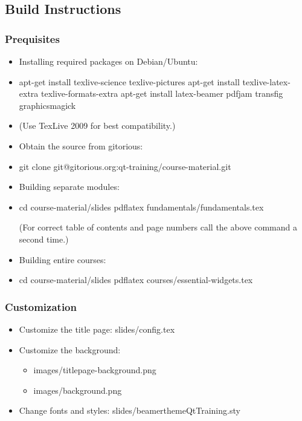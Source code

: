\subsection{Build Instructions}

\begin{slide}[fragile]
  \frametitle{Prequisites}
  \begin{itemize}
    \item Installing required packages on Debian/Ubuntu:
    \item[] \begin{shell}
apt-get install texlive-science texlive-pictures
apt-get install texlive-latex-extra texlive-formats-extra
apt-get install latex-beamer pdfjam transfig graphicsmagick
    \end{shell}
    \item[] {\footnotesize (Use TexLive 2009 for best compatibility.)}
    \item Obtain the source from gitorious:
    \item[] \begin{shell}
git clone git@gitorious.org:qt-training/course-material.git
    \end{shell}
  \end{itemize}
\end{slide}

\begin{slide}[fragile]
  \begin{itemize}
    \item Building separate modules:
    \item[] \begin{shell}
cd course-material/slides
pdflatex fundamentals/fundamentals.tex
    \end{shell}
    {\footnotesize(For correct table of contents and page numbers call the above command a second time.)}
    \item Building entire courses:
    \item[] \begin{shell}
cd course-material/slides
pdflatex courses/essential-widgets.tex
    \end{shell}
  \end{itemize}
\end{slide}

\begin{slide}
  \frametitle{Customization}
  \begin{itemize}
    \item Customize the title page: slides/config.tex
    \item Customize the background:
    \begin{itemize}
      \item images/titlepage-background.png
      \item images/background.png
    \end{itemize}
    \item Change fonts and styles: slides/beamerthemeQtTraining.sty
  \end{itemize}
\end{slide}

